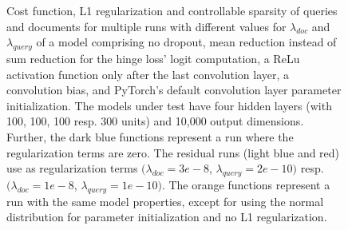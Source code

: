 \begin{figure}[htbp]
\caption[Costs function, L1 regularization and controllable respresentation sparsity of multiple runs with different values of the regularization terms $\lambda_{doc}$ and $\lambda_{query}$ of a model comprising sum reduction for hinge loss' logits computation, no dropout, a ReLu only after the last layer, a convolution bias, and PyTorch's default convolution parameter initialization]
{Cost function, L1 regularization and controllable sparsity of queries and documents for multiple runs with different values for $\lambda_{doc}$ and $\lambda_{query}$ of a model comprising no dropout, mean reduction instead of sum reduction for the hinge loss' logit computation, a ReLu activation function only after the last convolution layer, a convolution bias, and PyTorch's default convolution layer parameter initialization. The models under test have four hidden layers (with 100, 100, 100 resp. 300 units) and 10,000 output dimensions. Further, the dark blue functions represent a run where the regularization terms are zero. The residual runs (light blue and red) use as regularization terms $(\lambda_{doc}=3e-8$, $\lambda_{query}=2e-10)$ resp. $(\lambda_{doc}=1e-8$, $\lambda_{query}=1e-10)$. The orange functions represent a run with the same model properties, except for using the normal distribution for parameter initialization and no L1 regularization.}
\label{fig:2020-09-30:cost-fn-l1-reg-query-doc-repr-sparsity} %
\end{figure}

